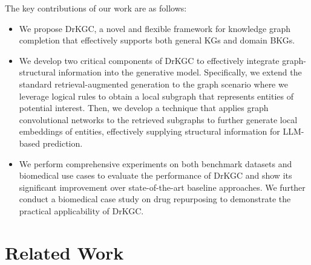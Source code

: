 \documentclass[11pt]{article}
\begin{document}





The key contributions of our work are as follows:
\begin{itemize}
    \item We propose DrKGC, a novel and flexible framework for knowledge graph completion that effectively supports both general KGs and domain BKGs.
    \item We develop two critical components of DrKGC to effectively integrate graph-structural information into the generative model. Specifically, we extend the standard retrieval-augmented generation to the graph scenario where we leverage logical rules to obtain a local subgraph that represents entities of potential interest. Then, we develop a technique that applies graph convolutional networks to the retrieved subgraphs to further generate local embeddings of entities, effectively supplying structural information for LLM-based prediction. 
    \item We perform comprehensive experiments on both benchmark datasets and biomedical use cases to evaluate the performance of DrKGC and show its significant improvement over state-of-the-art baseline approaches. We further conduct a biomedical case study on drug repurposing to demonstrate the practical applicability of DrKGC.
\end{itemize}




\section{Related Work}
\end{document}
